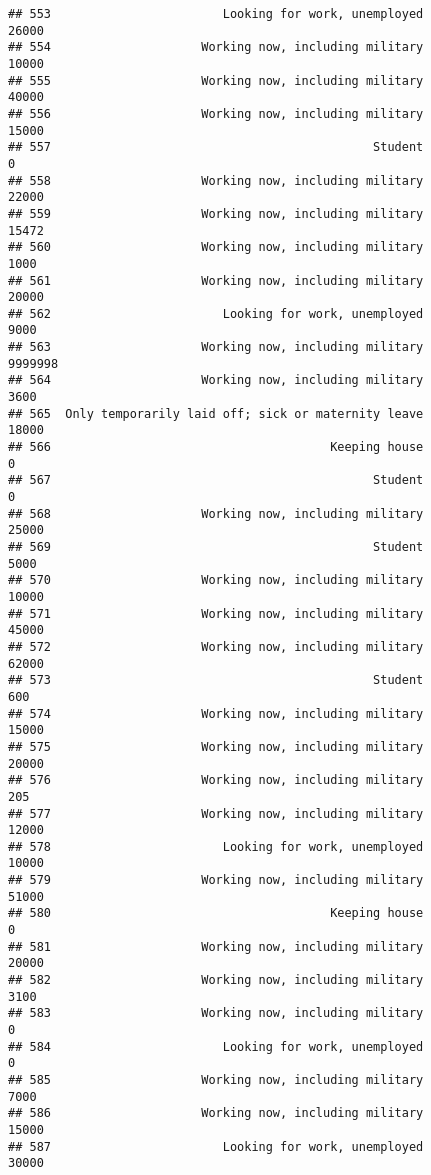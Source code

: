 \documentclass[]{book}
\theoremstyle{definition}
\theoremstyle{definition}
\theoremstyle{remark}
\begin{document}
\begin{verbatim}
## 553                        Looking for work, unemployed           26000
## 554                     Working now, including military           10000
## 555                     Working now, including military           40000
## 556                     Working now, including military           15000
## 557                                             Student               0
## 558                     Working now, including military           22000
## 559                     Working now, including military           15472
## 560                     Working now, including military            1000
## 561                     Working now, including military           20000
## 562                        Looking for work, unemployed            9000
## 563                     Working now, including military         9999998
## 564                     Working now, including military            3600
## 565  Only temporarily laid off; sick or maternity leave           18000
## 566                                       Keeping house               0
## 567                                             Student               0
## 568                     Working now, including military           25000
## 569                                             Student            5000
## 570                     Working now, including military           10000
## 571                     Working now, including military           45000
## 572                     Working now, including military           62000
## 573                                             Student             600
## 574                     Working now, including military           15000
## 575                     Working now, including military           20000
## 576                     Working now, including military             205
## 577                     Working now, including military           12000
## 578                        Looking for work, unemployed           10000
## 579                     Working now, including military           51000
## 580                                       Keeping house               0
## 581                     Working now, including military           20000
## 582                     Working now, including military            3100
## 583                     Working now, including military               0
## 584                        Looking for work, unemployed               0
## 585                     Working now, including military            7000
## 586                     Working now, including military           15000
## 587                        Looking for work, unemployed           30000

\end{verbatim}
\end{document}
